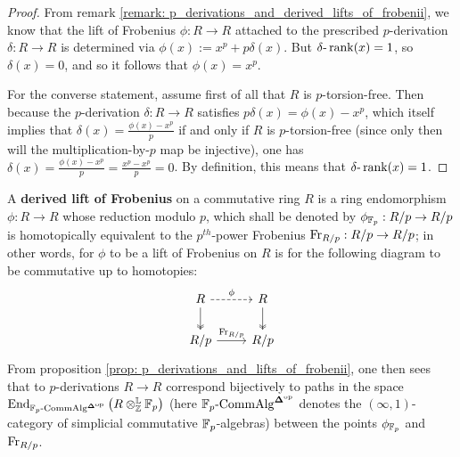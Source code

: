                 \begin{proof}
                    From remark \ref{remark: p_derivations_and_derived_lifts_of_frobenii}, we know that the lift of Frobenius $\phi: R \to R$ attached to the prescribed $p$-derivation $\delta: R \to R$ is determined via $\phi(x) := x^p + p\delta(x)$. But $\delta\text{-}\operatorname{rank}(x) = 1$, so $\delta(x) = 0$, and so it follows that $\phi(x) = x^p$. 
                    
                    For the converse statement, assume first of all that $R$ is $p$-torsion-free. Then because the $p$-derivation $\delta: R \to R$ satisfies $p\delta(x) = \phi(x) - x^p$, which itself implies that $\delta(x) = \frac{\phi(x) - x^p}{p}$ if and only if $R$ is $p$-torsion-free (since only then will the multiplication-by-$p$ map be injective), one has $\delta(x) = \frac{\phi(x) - x^p}{p} = \frac{x^p - x^p}{p} = 0$. By definition, this means that $\delta\text{-}\operatorname{rank}(x) = 1$.
                \end{proof}
            \begin{remark} \label{remark: p_derivations_and_derived_lifts_of_frobenii}
                A \textbf{derived lift of Frobenius} on a commutative ring $R$ is a ring endomorphism $\phi: R \to R$ whose reduction modulo $p$, which shall be denoted by $\phi_{\mathbb{F}_p}: R/p \to R/p$ is homotopically equivalent to the $p^{th}$-power Frobenius $\mathrm{Fr}_{R/p}: R/p \to R/p$; in other words, for $\phi$ to be a lift of Frobenius on $R$ is for the following diagram to be commutative up to homotopies:
                    $$
                        \begin{tikzcd}
                        	R & R \\
                        	{R/p} & {R/p}
                        	\arrow[two heads, from=1-1, to=2-1]
                        	\arrow[two heads, from=1-2, to=2-2]
                        	\arrow["{\Frob_{R/p}}", from=2-1, to=2-2]
                        	\arrow["\phi", dashed, from=1-1, to=1-2]
                        \end{tikzcd}       
                    $$
                From proposition \ref{prop: p_derivations_and_lifts_of_frobenii}, one then sees that to $p$-derivations $R \to R$ correspond bijectively to paths in the space $\End_{\F_p\-\Comm\Alg^{\simp^{\op}}}\left(R \tensor_{\Z}^{\L} \F_p\right)$ (here $\mathbb{F}_p\text{-}\mathrm{Comm}\mathrm{Alg}^{\mathbf{\Delta}^{\mathrm{op}}}$ denotes the $(\infty, 1)$-category of simplicial commutative $\mathbb{F}_p$-algebras) between the points $\phi_{\mathbb{F}_p}$ and $\mathrm{Fr}_{R/p}$.
            \end{remark}
            
